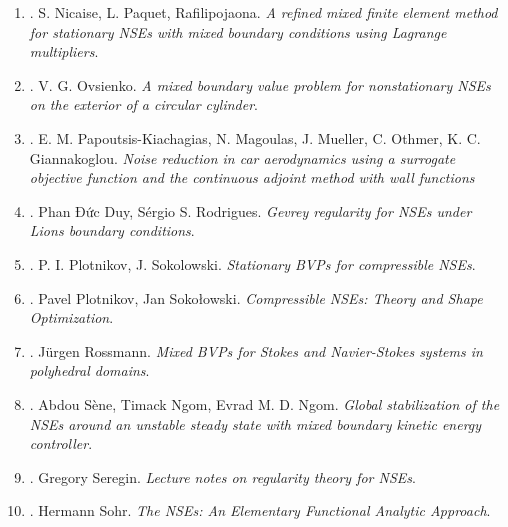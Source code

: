 \documentclass{article}
\begin{document}
\begin{enumerate}
	\item \cite{Nicaise_Paquet_Rafilipojaona2007}. {\sc S. Nicaise, L. Paquet, Rafilipojaona}. {\it A refined mixed finite element method for stationary NSEs with mixed boundary conditions using Lagrange multipliers}.
	\item \cite{Ovsienko1978}. {\sc V. G. Ovsienko}. {\it A mixed boundary value problem for nonstationary NSEs on the exterior of a circular cylinder}.
	\item \cite{Papoutsis-Kiachagias_Magoulas_Mueller_Othmer_Giannakoglou2015}. {\sc E. M. Papoutsis-Kiachagias, N. Magoulas, J. Mueller, C. Othmer, K. C. Giannakoglou}. {\it Noise reduction in car aerodynamics using a surrogate objective function and the continuous adjoint method with wall functions}
	\item \cite{Phan_Sergio2017}. {\sc Phan Đức Duy, S\'{e}rgio S. Rodrigues}. {\it Gevrey regularity for NSEs under Lions boundary conditions}.
	\item \cite{Plotnikov_Sokolowski2008}. {\sc P. I. Plotnikov, J. Sokolowski}. {\it Stationary BVPs for compressible NSEs}.
	\item \cite{Plotnikov_Sokolowski2012}. {\sc Pavel Plotnikov, Jan Soko\l owski}. {\it Compressible NSEs: Theory and Shape Optimization}.
	\item \cite{Rossmann2009}. {\sc J\"{u}rgen Rossmann}. {\it Mixed BVPs for Stokes and Navier-Stokes systems in polyhedral domains}.
	\item \cite{Sene_Ngom_Ngom2019}. {\sc Abdou S\`ene, Timack Ngom, Evrad M. D. Ngom}. {\it Global stabilization of the NSEs around an unstable steady state with mixed boundary kinetic energy controller}.
	\item \cite{Seregin2015}. {\sc Gregory Seregin}. {\it Lecture notes on regularity theory for NSEs}.	 
	\item \cite{Sohr2001,Sohr2013}. {\sc Hermann Sohr}. {\it The NSEs: An Elementary Functional Analytic Approach}.
	

\end{enumerate}
\end{document}
